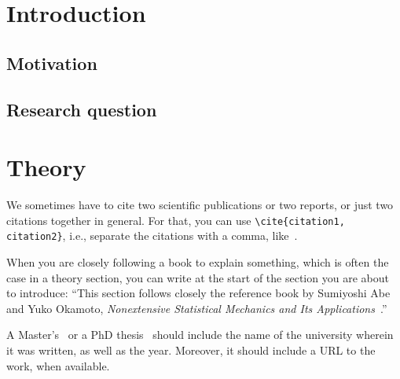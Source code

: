 \documentclass[a4paper,11pt,masters,en,listoffigures,listoftables]{NMBU}
\title{}
\author{}
\begin{document}


\startthesis %

\section{Introduction}

\subsection{Motivation}
\subsection{Research question}

\clearpage %
\section{Theory}

We sometimes have to cite two scientific publications or two reports, or just two citations together in general. For that, you can use \verb|\cite{citation1, citation2}|, i.e., separate the citations with a comma, like~\cite{Beck2000application, Beck2005timeseries}.

When you are closely following a book to explain something, which is often the case in a theory section, you can write at the start of the section you are about to introduce: ``This section follows closely the reference book by Sumiyoshi Abe and Yuko Okamoto, \emph{Nonextensive Statistical Mechanics and Its Applications}~\cite{Abe2001nonextensive}.''

A Master's~\cite{LastName2045norwegian} or a PhD thesis~\cite{Temult2038binding} should include the name of the university wherein it was written, as well as the year. Moreover, it should include a URL to the work, when available.
\end{document}
